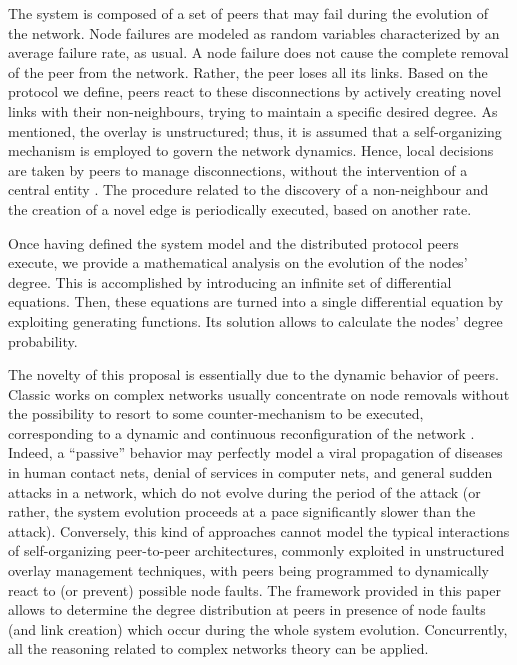 \documentclass[a4paper,twosided]{article}
\begin{document}
The system is composed of a set of peers that may fail during the evolution of the network.
Node failures are modeled as random variables characterized by an average failure rate, as usual. 
A node failure does not cause the complete removal of the peer from the network. Rather, the peer loses all its links.
Based on the protocol we define, peers react to these disconnections by actively creating novel links with their non-neigh\-bo\-urs, trying to maintain a specific desired degree. As mentioned, the overlay is unstructured; thus, it is assumed that a self-organizing mechanism is employed to govern the network dynamics. Hence, local decisions are taken by peers to manage disconnections, without the intervention of a central entity \cite{holzer}. 
The procedure related to the discovery of a non-neighbour and the creation of a novel edge is periodically executed, based on another rate.

Once having defined the system model and the distributed protocol peers execute, we provide a mathematical analysis on the evolution of the nodes' degree. This is accomplished by introducing an infinite set of differential equations. Then, these equations are turned into a single differential equation by exploiting generating functions. Its solution allows to calculate the nodes' degree probability.

The novelty of this proposal is essentially due to the dynamic behavior of peers. Classic works on complex networks usually concentrate on node removals without the possibility to resort to some counter-mechanism to be executed, corresponding to a dynamic and continuous reconfiguration of the network \cite{Newman03thestructure,broder,2000Nature_Albert,newmanHandbook}. Indeed, a ``passive'' behavior may perfectly model a viral propagation of diseases in human contact nets, denial of services in computer nets, and general sudden attacks in a network, which do not evolve during the period of the attack (or rather, the system evolution proceeds at a pace significantly slower than the attack). Conversely, this kind of approaches cannot model the typical interactions of self-organizing peer-to-peer architectures, 
commonly exploited in unstructured overlay management techniques,
with peers being programmed to dynamically react to (or prevent) possible node faults.
The framework provided in this paper allows to determine the degree distribution at peers in presence of node faults (and link creation) which occur during the whole system evolution. Concurrently, all the reasoning related to complex networks theory can be applied.
\end{document}
